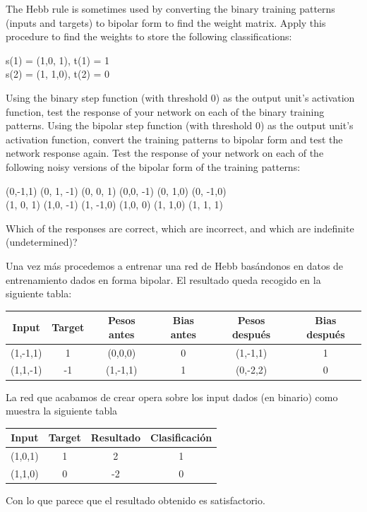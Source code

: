 \begin{problem}[6]
\ppart The Hebb rule is sometimes used by converting the binary training patterns (inputs
and targets) to bipolar form to find the weight matrix. Apply this procedure to
find the weights to store the following classifications:
\begin{center}
s(1) = (1,0, 1), t(1) = 1\\
s(2) = (1, 1,0), t(2) = 0
\end{center}
\ppart Using the binary step function (with threshold 0) as the output unit's activation
function, test the response of your network on each of the binary training patterns.
\ppart Using the bipolar step function (with threshold 0) as the output unit's activation
function, convert the training patterns to bipolar form and test the network response again.
\ppart Test the response of your network on each of the following noisy versions of the
bipolar form of the training patterns:
\begin{center}
(0,-1,1) (0, 1, -1) (0, 0, 1) (0,0, -1) (0, 1,0) (0, -1,0)\\
(1, 0, 1) (1,0, -1) (1, -1,0) (1,0, 0) (1, 1,0) (1, 1, 1)
\end{center}
Which of the responses are correct, which are incorrect, and which are indefinite
(undetermined)?

\solution
\spart
Una vez más procedemos a entrenar una red de Hebb basándonos en datos de entrenamiento dados en forma bipolar. El resultado queda recogido en la siguiente tabla:
\begin{center}
\begin{tabular}{|c|c|c|c|c|c|}
\hline
\textbf{Input} & \textbf{Target} & \textbf{Pesos antes} & \textbf{Bias antes} & \textbf{Pesos después} & \textbf{Bias después} \\
\hline
(1,-1,1) & 1  & (0,0,0) & 0 & (1,-1,1) & 1\\
(1,1,-1) & -1 & (1,-1,1) & 1 & (0,-2,2) & 0\\
\hline
\end{tabular}
\end{center}

\spart
La red que acabamos de crear opera sobre los input dados (en binario) como muestra la siguiente tabla
\begin{center}
\begin{tabular}{|c|c|c|c|}
\hline
\textbf{Input} & \textbf{Target} & \textbf{Resultado} & \textbf{Clasificación}\\
\hline
(1,0,1) & 1  & 2 & 1\\
(1,1,0) & 0 & -2 & 0\\
\hline
\end{tabular}
\end{center}
Con lo que parece que el resultado obtenido es satisfactorio.


\end{problem}
